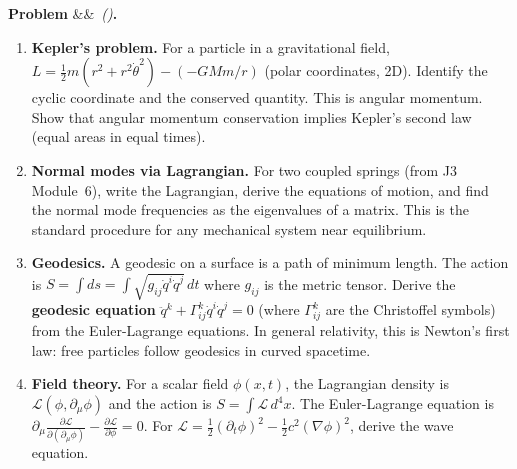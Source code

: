 \documentclass[12pt,a4paper]{article}
\newcounter{problem}
\newenvironment{problem}[1][]{\refstepcounter{problem}\par\vspace{6pt}\noindent\textbf{\color{MidBlue}Problem \theproblem}\ifx&#1&\else\ \textit{(#1)}\fi\textbf{.}\enskip}{\par\vspace{4pt}}
\begin{document}
\begin{problem}
\label{prob:applications_mechanics}
\begin{enumerate}[label=(\alph*),topsep=2pt]
  \item \textbf{Kepler's problem.} For a particle in a gravitational field, $L = \frac{1}{2}m(r^2+r^2\dot\theta^2)-(-GMm/r)$ (polar coordinates, 2D). Identify the cyclic coordinate and the conserved quantity. This is angular momentum. Show that angular momentum conservation implies Kepler's second law (equal areas in equal times).
  \item \textbf{Normal modes via Lagrangian.} For two coupled springs (from J3 Module~6), write the Lagrangian, derive the equations of motion, and find the normal mode frequencies as the eigenvalues of a matrix. This is the standard procedure for any mechanical system near equilibrium.
  \item \textbf{Geodesics.} A geodesic on a surface is a path of minimum length. The action is $S = \int ds = \int\sqrt{g_{ij}\dot q^i\dot q^j}\,dt$ where $g_{ij}$ is the metric tensor. Derive the \textbf{geodesic equation} $\ddot q^k + \Gamma^k_{ij}\dot q^i\dot q^j = 0$ (where $\Gamma^k_{ij}$ are the Christoffel symbols) from the Euler-Lagrange equations. In general relativity, this is Newton's first law: free particles follow geodesics in curved spacetime.
  \item \textbf{Field theory.} For a scalar field $\phi(x,t)$, the Lagrangian density is $\mathcal{L}(\phi,\partial_\mu\phi)$ and the action is $S=\int\mathcal{L}\,d^4x$. The Euler-Lagrange equation is $\partial_\mu\frac{\partial\mathcal{L}}{\partial(\partial_\mu\phi)}-\frac{\partial\mathcal{L}}{\partial\phi}=0$. For $\mathcal{L}=\frac{1}{2}(\partial_t\phi)^2-\frac{1}{2}c^2(\nabla\phi)^2$, derive the wave equation.
\end{enumerate}
\end{problem}
\end{document}
